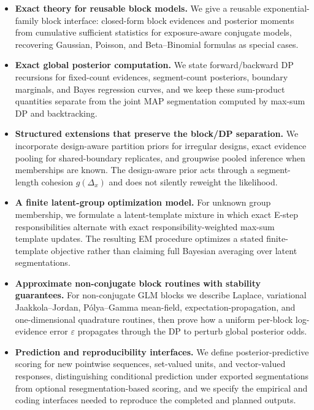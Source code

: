 \begin{itemize}
\item \textbf{Exact theory for reusable block models.}
We give a reusable exponential-family block interface: closed-form block evidences and posterior moments from cumulative sufficient statistics for exposure-aware conjugate models, recovering Gaussian, Poisson, and Beta--Binomial formulas as special cases.

\item \textbf{Exact global posterior computation.}
We state forward/backward DP recursions for fixed-count evidences, segment-count posteriors, boundary marginals, and Bayes regression curves, and we keep these sum-product quantities separate from the joint MAP segmentation computed by max-sum DP and backtracking.

\item \textbf{Structured extensions that preserve the block/DP separation.}
We incorporate design-aware partition priors for irregular designs, exact evidence pooling for shared-boundary replicates, and groupwise pooled inference when memberships are known. The design-aware prior acts through a segment-length cohesion $g(\Delta_x)$ and does not silently reweight the likelihood.

\item \textbf{A finite latent-group optimization model.}
For unknown group membership, we formulate a latent-template mixture in which exact E-step responsibilities alternate with exact responsibility-weighted max-sum template updates. The resulting EM procedure optimizes a stated finite-template objective rather than claiming full Bayesian averaging over latent segmentations.

\item \textbf{Approximate non-conjugate block routines with stability guarantees.}
For non-conjugate GLM blocks we describe Laplace, variational Jaakkola--Jordan, P\'olya--Gamma mean-field, expectation-propagation, and one-dimensional quadrature routines, then prove how a uniform per-block log-evidence error $\varepsilon$ propagates through the DP to perturb global posterior odds.

\item \textbf{Prediction and reproducibility interfaces.}
We define posterior-predictive scoring for new pointwise sequences, set-valued units, and vector-valued responses, distinguishing conditional prediction under exported segmentations from optional resegmentation-based scoring, and we specify the empirical and coding interfaces needed to reproduce the completed and planned outputs.
\end{itemize}

